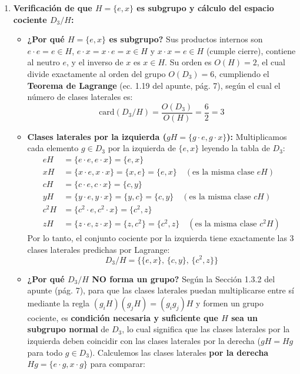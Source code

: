 \documentclass[11pt, a4paper]{article}
\begin{document}
\begin{enumerate}
    \item \textbf{Verificación de que $H = \{e, x\}$ es subgrupo y cálculo del espacio cociente $D_3/H$:}
    \begin{itemize}
        \item \textbf{¿Por qué $H = \{e, x\}$ es subgrupo?} Sus productos internos son $e \cdot e = e \in H$, $e \cdot x = x \cdot e = x \in H$ y $x \cdot x = e \in H$ (cumple cierre), contiene al neutro $e$, y el inverso de $x$ es $x \in H$. Su orden es $O(H) = 2$, el cual divide exactamente al orden del grupo $O(D_3) = 6$, cumpliendo el \textbf{Teorema de Lagrange} (ec. 1.19 del apunte, pág. 7), según el cual el número de clases laterales es:
        \[
        \text{card}(D_3/H) = \frac{O(D_3)}{O(H)} = \frac{6}{2} = 3
        \]
        \item \textbf{Clases laterales por la izquierda ($gH = \{g \cdot e, g \cdot x\}$):} Multiplicamos cada elemento $g \in D_3$ por la izquierda de $\{e, x\}$ leyendo la tabla de $D_3$:
        \begin{align*}
            eH &= \{e \cdot e, e \cdot x\} = \{e, x\} \\
            xH &= \{x \cdot e, x \cdot x\} = \{x, e\} = \{e, x\} \quad (\text{es la misma clase } eH) \\
            cH &= \{c \cdot e, c \cdot x\} = \{c, y\} \\
            yH &= \{y \cdot e, y \cdot x\} = \{y, c\} = \{c, y\} \quad (\text{es la misma clase } cH) \\
            c^2H &= \{c^2 \cdot e, c^2 \cdot x\} = \{c^2, z\} \\
            zH &= \{z \cdot e, z \cdot x\} = \{z, c^2\} = \{c^2, z\} \quad (\text{es la misma clase } c^2H)
        \end{align*}
        Por lo tanto, el conjunto cociente por la izquierda tiene exactamente las 3 clases laterales predichas por Lagrange:
        \[
        D_3/H = \big\{ \{e, x\}, \, \{c, y\}, \, \{c^2, z\} \big\}
        \]
        \item \textbf{¿Por qué $D_3/H$ NO forma un grupo?}
        Según la Sección 1.3.2 del apunte (pág. 7), para que las clases laterales puedan multiplicarse entre sí mediante la regla $(g_i H)(g_j H) = (g_i g_j)H$ y formen un grupo cociente, es \textbf{condición necesaria y suficiente que $H$ sea un subgrupo normal} de $D_3$, lo cual significa que las clases laterales por la izquierda deben coincidir con las clases laterales por la derecha ($gH = Hg$ para todo $g \in D_3$).
        Calculemos las clases laterales \textbf{por la derecha} $Hg = \{e \cdot g, x \cdot g\}$ para comparar:

\end{itemize}
\end{enumerate}
\end{document}
